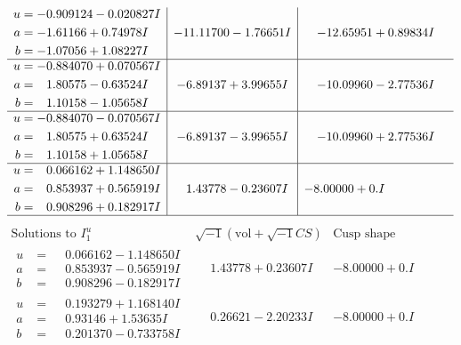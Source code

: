 \documentclass[1p]{elsarticle_modified}
\theoremstyle{definition}
\newcommand{\I}{\sqrt{-1}}
\begin{document}
$$\begin{array}{c|c|c}
\begin{aligned}
u &= -0.909124 - 0.020827 I \\
a &= -1.61166 + 0.74978 I \\
b &= -1.07056 + 1.08227 I\end{aligned}
 & -11.11700 - 1.76651 I & -12.65951 + 0.89834 I \\ \hline\begin{aligned}
u &= -0.884070 + 0.070567 I \\
a &= \phantom{-}1.80575 - 0.63524 I \\
b &= \phantom{-}1.10158 - 1.05658 I\end{aligned}
 & -6.89137 + 3.99655 I & -10.09960 - 2.77536 I \\ \hline\begin{aligned}
u &= -0.884070 - 0.070567 I \\
a &= \phantom{-}1.80575 + 0.63524 I \\
b &= \phantom{-}1.10158 + 1.05658 I\end{aligned}
 & -6.89137 - 3.99655 I & -10.09960 + 2.77536 I \\ \hline\begin{aligned}
u &= \phantom{-}0.066162 + 1.148650 I \\
a &= \phantom{-}0.853937 + 0.565919 I \\
b &= \phantom{-}0.908296 + 0.182917 I\end{aligned}
 & \phantom{-}1.43778 - 0.23607 I & -8.00000 + 0. I\phantom{ +0.000000I}\\
 \hline 
 \end{array}$$\newpage$$\begin{array}{c|c|c}  
\text{Solutions to }I^u_{1}& \I (\text{vol} + \sqrt{-1}CS) & \text{Cusp shape}\\
 \hline 
\begin{aligned}
u &= \phantom{-}0.066162 - 1.148650 I \\
a &= \phantom{-}0.853937 - 0.565919 I \\
b &= \phantom{-}0.908296 - 0.182917 I\end{aligned}
 & \phantom{-}1.43778 + 0.23607 I & -8.00000 + 0. I\phantom{ +0.000000I} \\ \hline\begin{aligned}
u &= \phantom{-}0.193279 + 1.168140 I \\
a &= \phantom{-}0.93146 + 1.53635 I \\
b &= \phantom{-}0.201370 - 0.733758 I\end{aligned}
 & \phantom{-}0.26621 - 2.20233 I & -8.00000 + 0. I\phantom{ +0.000000I} \\ \hline\begin{aligned}

\end{aligned}
\end{array}$$
\end{document}
